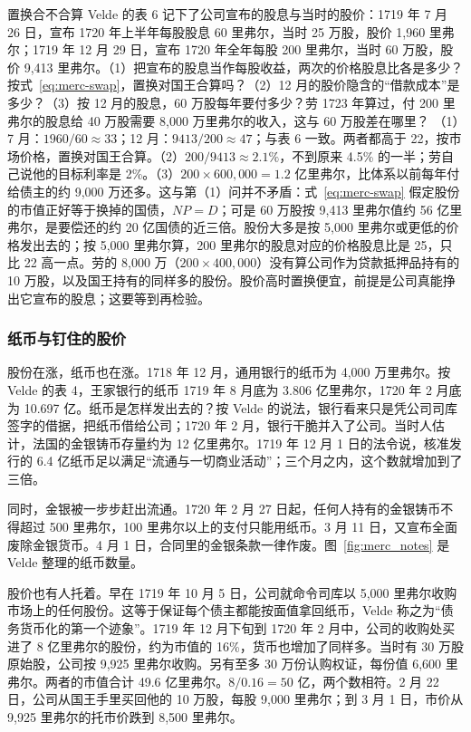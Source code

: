 \begin{example}{置换合不合算}\label{ex:merc-swap}
Velde 的表 6 记下了公司宣布的股息与当时的股价：1719 年 7 月 26 日，宣布 1720 年上半年每股股息 60 里弗尔，当时 25 万股，股价 1,960 里弗尔；1719 年 12 月 29 日，宣布 1720 年全年每股 200 里弗尔，当时 60 万股，股价 9,413 里弗尔\cite{velde2003}。（1）把宣布的股息当作每股收益，两次的价格股息比各是多少？按式~\eqref{eq:merc-swap}，置换对国王合算吗？（2）12 月的股价隐含的“借款成本”是多少？（3）按 12 月的股息，60 万股每年要付多少？劳 1723 年算过，付 200 里弗尔的股息给 40 万股需要 8,000 万里弗尔的收入\cite{velde2003}，这与 60 万股差在哪里？
\solution （1）7 月：$1960/60\approx33$；12 月：$9413/200\approx47$；与表 6 一致。两者都高于 22，按市场价格，置换对国王合算。（2）$200/9413\approx2.1\%$，不到原来 4.5\% 的一半；劳自己说他的目标利率是 2\%\cite{velde2003}。（3）$200\times600{,}000=1.2$ 亿里弗尔，比体系以前每年付给债主的约 9,000 万还多。这与第（1）问并不矛盾：式~\eqref{eq:merc-swap} 假定股份的市值正好等于换掉的国债，$NP=D$；可是 60 万股按 9,413 里弗尔值约 56 亿里弗尔，是要偿还的约 20 亿国债的近三倍。股份大多是按 5,000 里弗尔或更低的价格发出去的；按 5,000 里弗尔算，200 里弗尔的股息对应的价格股息比是 25，只比 22 高一点。劳的 8,000 万（$200\times400{,}000$）没有算公司作为贷款抵押品持有的 10 万股，以及国王持有的同样多的股份\cite{velde2003}。股价高时置换便宜，前提是公司真能挣出它宣布的股息；这要等到再检验。
\end{example}

\subsubsection{纸币与钉住的股价}
股份在涨，纸币也在涨。1718 年 12 月，通用银行的纸币为 4,000 万里弗尔。按 Velde 的表 4，王家银行的纸币 1719 年 8 月底为 3.806 亿里弗尔，1720 年 2 月底为 10.697 亿\cite{velde2003}。纸币是怎样发出去的？按 Velde 的说法，银行看来只是凭公司司库签字的借据，把纸币借给公司；1720 年 2 月，银行干脆并入了公司\cite{velde2003}。当时人估计，法国的金银铸币存量约为 12 亿里弗尔。1719 年 12 月 1 日的法令说，核准发行的 6.4 亿纸币足以满足“流通与一切商业活动”；三个月之内，这个数就增加到了三倍\cite{velde2003}。

同时，金银被一步步赶出流通。1720 年 2 月 27 日起，任何人持有的金银铸币不得超过 500 里弗尔，100 里弗尔以上的支付只能用纸币。3 月 11 日，又宣布全面废除金银货币。4 月 1 日，合同里的金银条款一律作废\cite{velde2003}。图~\ref{fig:merc_notes} 是 Velde 整理的纸币数量。

股价也有人托着。早在 1719 年 10 月 5 日，公司就命令司库以 5,000 里弗尔收购市场上的任何股份。这等于保证每个债主都能按面值拿回纸币，Velde 称之为“债务货币化的第一个迹象”\cite{velde2003}。1719 年 12 月下旬到 1720 年 2 月中，公司的收购处买进了 8 亿里弗尔的股份，约为市值的 16\%，货币也增加了同样多。当时有 30 万股原始股，公司按 9,925 里弗尔收购。另有至多 30 万份认购权证，每份值 6,600 里弗尔。两者的市值合计 49.6 亿里弗尔\cite{velde2003}。$8/0.16=50$ 亿，两个数相符。2 月 22 日，公司从国王手里买回他的 10 万股，每股 9,000 里弗尔；到 3 月 1 日，市价从 9,925 里弗尔的托市价跌到 8,500 里弗尔\cite{velde2003}。

